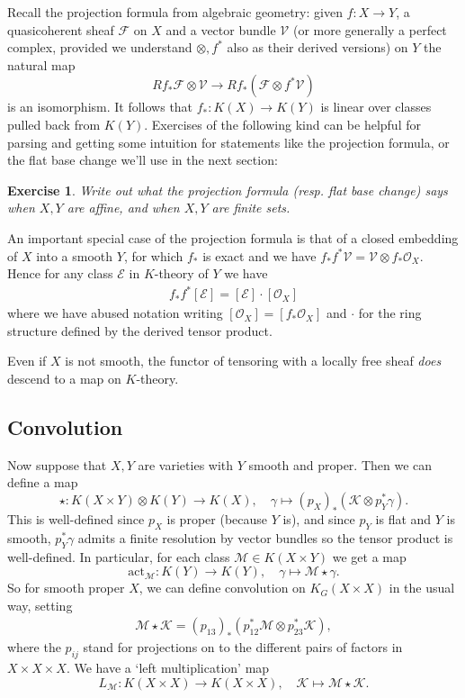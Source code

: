 \documentclass[11pt]{amsart}
\newtheorem{exercise}[dummy]{Exercise}
\theoremstyle{definition}
\newcommand{\Kc}{\mathcal{K}}
\newcommand{\Mca}{\mathcal{M}}
\newcommand{\act}{\mathrm{act}}
\newcommand{\Ec}{\mathcal{E}}
\newcommand{\Fc}{\mathcal{F}}
\newcommand{\Oc}{\mathcal{O}}
\numberwithin{equation}{subsection}
\numberwithin{figure}{subsection}
\begin{document}
Recall the projection formula from algebraic geometry: given $f:X\rightarrow Y$, a quasicoherent sheaf $\Fc$ on $X$ and a vector bundle $\mathcal{V}$ (or more generally a perfect complex, provided we understand $\otimes,f^*$ also as their derived versions) on $Y$ the natural map 
$$
Rf_*\Fc\otimes \mathcal{V}\rightarrow Rf_*\left(\Fc\otimes f^*\mathcal{V}\right)
$$
is an isomorphism. It follows that $f_*:K(X)\rightarrow K(Y)$ is linear over classes pulled back from $K(Y)$. Exercises of the following kind can be helpful for parsing and getting some intuition for statements like the projection formula, or the flat base change we'll use in the next section:
\begin{exercise}
Write out what the projection formula (resp. flat base change) says when $X,Y$ are affine, and when $X,Y$ are finite sets.
\end{exercise}
An important special case of the projection formula is that of a closed embedding of $X$ into a smooth $Y$, for which $f_*$ is exact and we have $f_*f^*\mathcal{V} = \mathcal{V}\otimes f_*\mathcal{O}_X$. Hence for any class $\Ec$ in $K$-theory of $Y$ we have 
\begin{align}
\label{eq:pushpull-closed}
f_*f^*[\Ec] = [\Ec]\cdot[\Oc_X]
\end{align}
 where we have abused notation writing $[\Oc_X]= [f_*\Oc_X]$ and $\cdot $ for the ring structure defined by the derived tensor product.



Even if $X$ is not smooth, the functor of tensoring with a locally free sheaf \emph{does} descend to a map on $K$-theory. 


\subsection{Convolution}
Now suppose that $X,Y$ are varieties with $Y$ smooth and proper. Then we can define a map
$$
\star\colon K(X\times Y)\otimes K(Y)\rightarrow  K(X), \quad \gamma\mapsto (p_X)_*\left(\mathcal{K}\otimes p_Y^*\gamma\right).
$$
This is well-defined since $p_X$ is proper (because $Y$ is), and since $p_Y$ is flat and $Y$ is smooth, $p_Y^*\gamma$ admits a finite resolution by vector bundles so the tensor product is well-defined. In particular, for each class $\Mca\in K(X\times Y)$ we get a map
$$
\act_\Mca \colon K(Y)\rightarrow K(Y), \quad \gamma\mapsto \Mca\star \gamma.
$$
So for smooth proper $X$, we can define convolution on $K_G(X\times X)$ in the usual way, setting
\begin{align}
\label{eq:convolution-mm}
\Mca\star\Kc = (p_{13})_*\left(p_{12}^*\Mca\otimes p_{23}^*\Kc\right),
\end{align}
where the $p_{ij}$ stand for projections on to the different pairs of factors in $X\times X\times X$. We have a `left multiplication' map
$$
L_\Mca \colon  K(X\times X)\rightarrow K(X\times X), \quad \Kc\mapsto \Mca\star\Kc.
$$
\end{document}
